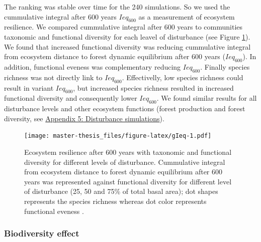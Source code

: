 \documentclass[12pt,]{article}
\theoremstyle{definition}
\theoremstyle{definition}
\theoremstyle{remark}
\begin{document}
The ranking was stable over time for the 240 simulations. So we used the
cummulative integral after 600 years \(Ieq_{600}\) as a measurement of
ecosystem resilience. We compared cummulative integral after 600 years
to communities taxonomic and functional diversity for each leavel of
disturbance (see Figure \ref{fig:gIeq}). We found that increased
functional diversity \citep[FDiv,][]{villeger_new_2008} was reducing
cummulative integral from ecosystem distance to forest dynamic
equilibrium after 600 years (\(Ieq_{600}\)). In addition, functional
eveness was complementary reducing \(Ieq_{600}\). Finally species
richness was not directly link to \(Ieq_{600}\). Effectivelly, low
species richness could result in variant \(Ieq_{600}\), but increased
species richness resulted in increased functional diversity and
consequently lower \(Ieq_{600}\). We found similar results for all
disturbance levels and other ecosystem functions (forest production and
forest diversity, see
\protect\hyperlink{appendix-5-disturbance-simulations}{Appendix 5:
Disturbance simulations}).

\begin{figure}[htbp]
\centering
\texttt{[image: master-thesis\_files/figure-latex/gIeq-1.pdf]}
\caption{\label{fig:gIeq}Ecosystem resilience after 600 years with taxonomic
and functional diversity for different levels of disturbance.
Cummulative integral from ecosystem distance to forest dynamic
equilibrium after 600 years was represented against functional diversity
\citep[FDiv,][]{villeger_new_2008} for different level of disturbance
(25, 50 and 75\% of total basal area); dot shapes represents the species
richness whereas dot color represents functional eveness
\citep[FEve,][]{villeger_new_2008}.}
\end{figure}

\subsubsection{Biodiversity effect}\label{biodiversity-effect-1}
\end{document}
